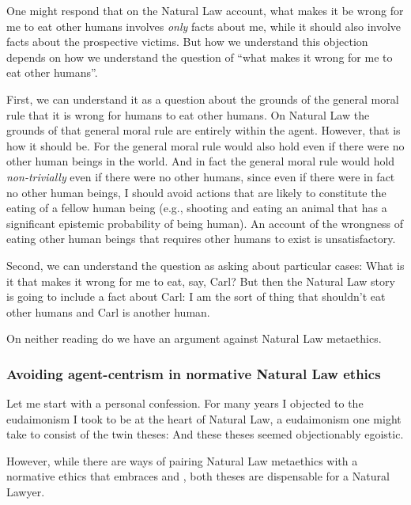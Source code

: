 One might respond that on the Natural Law account, what makes it be wrong for me to eat other humans involves \textit{only} facts
about me, while it should also involve facts about the prospective victims. But how we understand this objection depends on how 
we understand the question of ``what makes it wrong for me to eat other humans''. 

First, we can understand it as a question about the grounds of 
the general moral rule that it is wrong for humans to eat other humans. On Natural Law the grounds of that general moral rule 
are entirely within the agent. However, that is how it should be. For the general moral rule would also hold even if there were
no other human beings in the world. And in fact the general moral rule would hold \textit{non-trivially} even if there were no
other humans, since even if there were in fact no other human beings, I should avoid actions that are likely to constitute the eating
of a fellow human being (e.g., shooting and eating an animal that has a significant epistemic probability of being human). 
An account of the wrongness of eating other human beings that requires other humans to exist is unsatisfactory.

Second, we can understand the question as asking about particular cases: What is it that makes it wrong for me to eat, say, Carl?
But then the Natural Law story is going to include a fact about Carl: I am the sort of thing that shouldn't eat other humans 
and Carl is another human. 

On neither reading do we have an argument against Natural Law metaethics.

\subsubsection{Avoiding agent-centrism in normative Natural Law ethics}
Let me start with a personal confession. For many years I objected to the eudaimonism I took to be at the heart of Natural
Law, a eudaimonism one might take to consist of the twin theses:
And these theses seemed objectionably egoistic.

However, while there are ways of pairing Natural Law metaethics with a normative ethics
that embraces  and , both theses are dispensable for a Natural Lawyer. 

